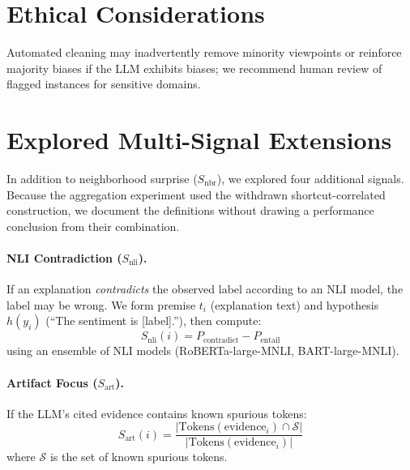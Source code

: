 \documentclass[letterpaper]{article}
\newcommand{\Snbr}{S_{\text{nbr}}}
\newcommand{\Snli}{S_{\text{nli}}}
\newcommand{\Sart}{S_{\text{art}}}
\begin{document}
\section*{Ethical Considerations}

Automated cleaning may inadvertently remove minority viewpoints or reinforce majority biases if the LLM exhibits biases; we recommend human review of flagged instances for sensitive domains.



\appendix
\section{Explored Multi-Signal Extensions}
\label{sec:appendix_signals}

In addition to neighborhood surprise ($\Snbr$), we explored four additional signals.
Because the aggregation experiment used the withdrawn shortcut-correlated construction, we document the definitions without drawing a performance conclusion from their combination.

\paragraph{NLI Contradiction ($\Snli$).}
If an explanation \textit{contradicts} the observed label according to an NLI model, the label may be wrong.
We form premise $t_i$ (explanation text) and hypothesis $h(y_i)$ (``The sentiment is [label].''), then compute:
\begin{equation}
    \Snli(i) = P_{\text{contradict}} - P_{\text{entail}}
\end{equation}
using an ensemble of NLI models (RoBERTa-large-MNLI, BART-large-MNLI).

\paragraph{Artifact Focus ($\Sart$).}
If the LLM's cited evidence contains known spurious tokens:
\begin{equation}
    \Sart(i) = \frac{|\text{Tokens}(\text{evidence}_i) \cap \mathcal{S}|}{|\text{Tokens}(\text{evidence}_i)|}
\end{equation}
where $\mathcal{S}$ is the set of known spurious tokens.
\end{document}
